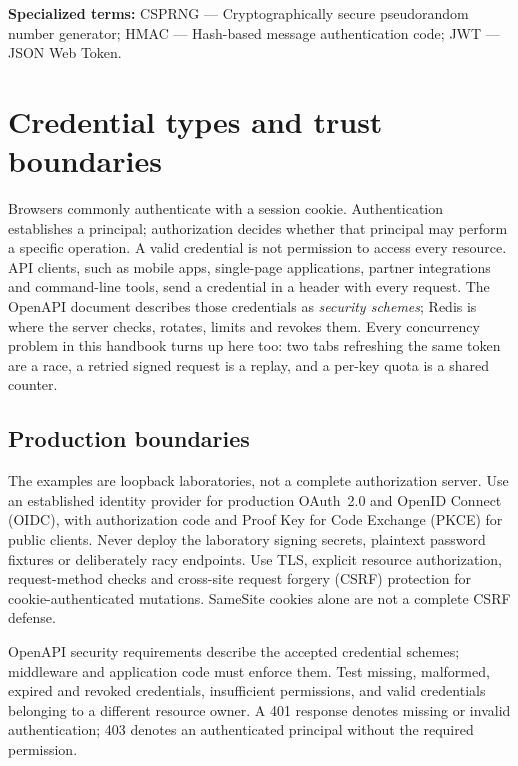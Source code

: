 \par\smallskip\noindent\textbf{Specialized terms:} CSPRNG --- Cryptographically secure pseudorandom number generator; HMAC --- Hash-based message authentication code; JWT --- JSON Web Token.\par\smallskip
\section{Credential types and trust boundaries}\label{sec:api-tokens}
Browsers commonly authenticate with a session cookie. Authentication establishes a principal; authorization decides whether that principal may perform a specific operation. A valid credential is not permission to access every resource. API clients, such as mobile apps, single-page applications, partner integrations and command-line tools, send a credential in a header with every request. The OpenAPI document describes those credentials as \emph{security schemes}; Redis is where the server checks, rotates, limits and revokes them. Every concurrency problem in this handbook turns up here too: two tabs refreshing the same token are a race, a retried signed request is a replay, and a per-key quota is a shared counter.

\subsection{Production boundaries}
The examples are loopback laboratories, not a complete authorization server. Use an established identity provider for production OAuth~2.0 and OpenID Connect (OIDC), with authorization code and Proof Key for Code Exchange (PKCE) for public clients. Never deploy the laboratory signing secrets, plaintext password fixtures or deliberately racy endpoints. Use TLS, explicit resource authorization, request-method checks and cross-site request forgery (CSRF) protection for cookie-authenticated mutations. SameSite cookies alone are not a complete CSRF defense.

OpenAPI security requirements describe the accepted credential schemes; middleware and application code must enforce them. Test missing, malformed, expired and revoked credentials, insufficient permissions, and valid credentials belonging to a different resource owner. A 401 response denotes missing or invalid authentication; 403 denotes an authenticated principal without the required permission.

